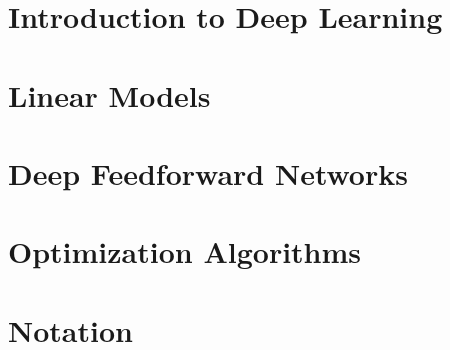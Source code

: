 \documentclass[a4paper,oneside]{book}
\begin{document}

\tableofcontents
\newpage 
\chapter{Introduction to Deep Learning}


\chapter{Linear Models}
\label{chap:linear_models}



\chapter{Deep Feedforward Networks}


\chapter{Optimization Algorithms}


\chapter{Notation}


%
\end{document}
